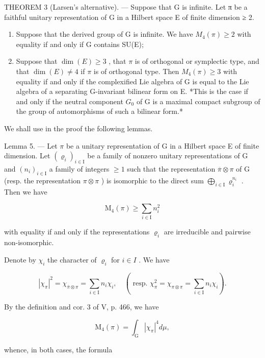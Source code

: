 THEOREM 3 (Larsen's alternative). --- Suppose that G is infinite. Let π be a faithful unitary representation of G in a Hilbert space E of finite dimension ≥ 2.

\begin{enumerate}
\def\labelenumi{\alph{enumi})}
\item
  Suppose that the derived group of G is infinite. We have \(M_{4}(\pi) \geqslant 2\) with equality if and only if G contains SU(E);
\item
  Suppose that \(\dim(E) \geqslant 3\) , that \(\pi\) is of orthogonal or symplectic type, and that \(\dim(E) \neq 4\) if \(\pi\) is of orthogonal type. Then \(M_4(\pi) \geqslant 3\) with equality if and only if the complexified Lie algebra of G is equal to the Lie algebra of a separating G-invariant bilinear form on E. *This is the case if and only if the neutral component \(G_0\) of G is a maximal compact subgroup of the group of automorphisms of such a bilinear form.*
\end{enumerate}

We shall use in the proof the following lemmas.

Lemma 5. --- Let \(\pi\) be a unitary representation of G in a Hilbert space E of finite dimension. Let \((\varrho_{i})_{i\in\mathrm{I}}\) be a family of nonzero unitary representations of G and \((n_{i})_{i\in\mathrm{I}}\) a family of integers \(\geqslant 1\) such that the representation \(\overline{\pi}\otimes\pi\) of G (resp. the representation \(\pi\otimes\pi\) ) is isomorphic to the direct sum \(\bigoplus_{i\in\mathrm{I}}\varrho_{i}^{n_{i}}\) . Then we have

\[
\mathrm{M} _ {4} (\pi) \geqslant \sum_ {i \in \mathrm{I}} n _ {i} ^ {2}
\]

with equality if and only if the representations \(\varrho_{i}\) are irreducible and pairwise non-isomorphic.

Denote by \(\chi_{i}\) the character of \(\varrho_{i}\) for \(i\in I\) . We have

\[
| \chi_ {\pi} | ^ {2} = \chi_ {\overline {{\pi}} \otimes \pi} = \sum_ {i \in \mathrm{I}} n _ {i} \chi_ {i}, \quad (\text { resp. } \chi_ {\pi} ^ {2} = \chi_ {\pi \otimes \pi} = \sum_ {i \in \mathrm{I}} n _ {i} \chi_ {i}).
\]

By the definition and cor. 3 of V, p. 466, we have

\[
\mathrm{M} _ {4} (\pi) = \int_ {\mathrm{G}} | \chi_ {\pi} | ^ {4} d \mu ,
\]

whence, in both cases, the formula

